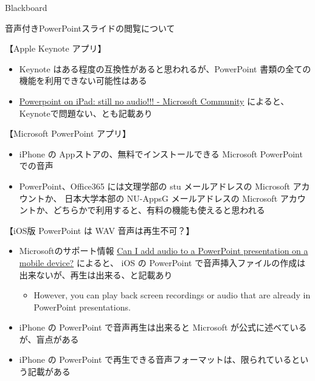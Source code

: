 \documentclass[a4j,10pt]{jsarticle}
\begin{document}
{\begin{frame}[label={sec:org166405d},fragile]{Blackboard}
\begin{block}{音声付きPowerPointスライドの閲覧について}
\par
\begin{block}{【Apple Keynote アプリ】}
\begin{itemize}
\item Keynote はある程度の互換性があると思われるが、PowerPoint 書類の全ての機能を利用できない可能性はある
\item \href{https://answers.microsoft.com/en-us/msoffice/forum/all/powerpoint-on-ipad-still-no-audio/b9a77c5d-a744-4829-b28e-6fd409b21ad6}{Powerpoint on iPad: still no audio!!! - Microsoft Community} によると、Keynoteで問題ない、とも記載あり
\end{itemize}
\end{block}
\par
\begin{block}{【Microsoft PowerPoint アプリ】}
\begin{itemize}
\item iPhone の Appストアの、無料でインストールできる Microsoft PowerPoint での音声
\item PowerPoint、Office365 には文理学部の stu メールアドレスの Microsoft アカウントか、
日本大学本部の NU-AppsG メールアドレスの Microsoft アカウントか、どちらかで利用すると、有料の機能も使えると思われる
\end{itemize}
\end{block}
\par
\begin{block}{【iOS版 PowerPoint は WAV 音声は再生不可？】}
\begin{itemize}
\item Microsoftのサポート情報 \href{https://support.microsoft.com/en-gb/office/can-i-add-audio-to-a-powerpoint-presentation-on-a-mobile-device-76a88d09-96b2-465c-a0ad-036a24940d40\#:\~:text=On\%20iOS\%3A\%20No,are\%20already\%20in\%20PowerPoint\%20presentations.}{Can I add audio to a PowerPoint presentation on a mobile device?}
によると、 iOS の PowerPoint で音声挿入ファイルの作成は出来ないが、再生は出来る、と記載あり
\begin{itemize}
\item However, you can play back screen recordings or audio that are already in PowerPoint presentations.
\end{itemize}
\item iPhone の PowerPoint で音声再生は出来ると Microsoft が公式に述べているが、盲点がある
\item iPhone の PowerPoint で再生できる音声フォーマットは、限られているという記載がある
\begin{itemize}

\end{itemize}
\end{itemize}
\end{block}
\end{block}
\end{frame}}
\end{document}
